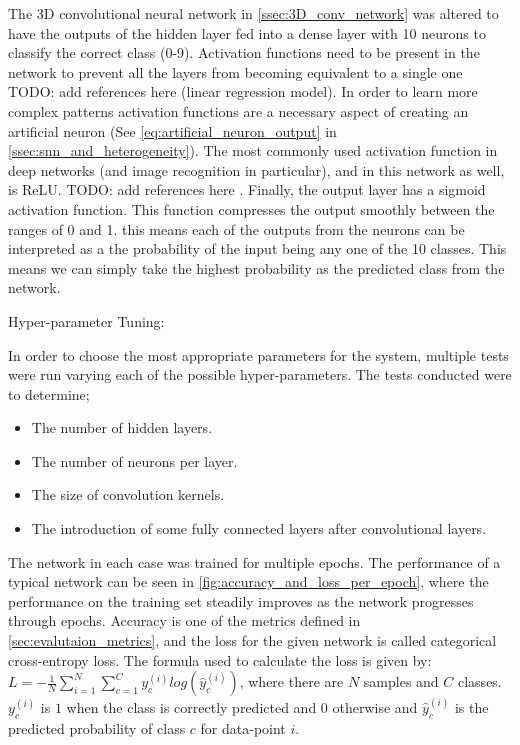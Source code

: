 The 3D convolutional neural network in \cref{ssec:3D_conv_network} was altered to have the outputs of the hidden layer fed into a dense layer with 10 neurons to classify the correct class (0-9). Activation functions need to be present in the network to prevent all the layers from becoming equivalent to a single one \color{red} TODO: add references here \color{black} (linear regression model). In order to learn more complex patterns activation functions are a necessary aspect of creating an artificial neuron (See \cref{eq:artificial_neuron_output} in \cref{ssec:snn_and_heterogeneity}). The most commonly used activation function in deep networks (and image recognition in particular), and in this network as well, is ReLU. \color{red} TODO: add references here \color{black}. Finally, the output layer has a sigmoid activation function. This function compresses the output smoothly between the ranges of 0 and 1. this means each of the outputs from the neurons can be interpreted as a the probability of the input being any one of the 10 classes. This means we can simply take the highest probability as the predicted class from the network.

Hyper-parameter Tuning:

In order to choose the most appropriate parameters for the system, multiple tests were run varying each of the possible hyper-parameters. The tests conducted were to determine;

\begin{itemize}
    \item The number of hidden layers.
    \item The number of neurons per layer.
    \item The size of convolution kernels.
    \item The introduction of some fully connected layers after convolutional layers.
\end{itemize}

The network in each case was trained for multiple epochs. The performance of a typical network can be seen in \cref{fig:accuracy_and_loss_per_epoch}, where the performance on the training set steadily improves as the network progresses through epochs. Accuracy is one of the metrics defined in \cref{sec:evalutaion_metrics}, and the loss for the given network is called categorical cross-entropy loss. The formula used to calculate the loss is given by: $ L = -\frac{1}{N}\sum^N_{i=1}\sum^C_{c=1}y_c^{(i)}log(\hat{y}_c^{(i)}) $, where there are $ N $ samples and $ C $ classes. $ y_c^{(i)} $ is $ 1 $ when the class is correctly predicted and $ 0 $ otherwise and $ \hat{y}_c^{(i)} $ is the predicted probability of class $ c $ for data-point $ i $.

